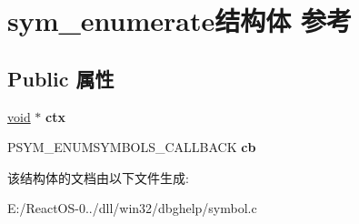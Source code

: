 \hypertarget{structsym__enumerate}{}\section{sym\+\_\+enumerate结构体 参考}
\label{structsym__enumerate}
\subsection*{Public 属性}
\begin{DoxyCompactItemize}
\item 
\mbox{\label{structsym__enumerate_ab2f0ea19dc26b39ac554c8a674cad885}} 
\hyperlink{interfacevoid}{void} $\ast$ {\bfseries ctx}
\item 
\mbox{\label{structsym__enumerate_a24064bd70b81884d55cfbcdf5c189d5d}} 
P\+S\+Y\+M\+\_\+\+E\+N\+U\+M\+S\+Y\+M\+B\+O\+L\+S\+\_\+\+C\+A\+L\+L\+B\+A\+CK {\bfseries cb}
\end{DoxyCompactItemize}


该结构体的文档由以下文件生成\+:\begin{DoxyCompactItemize}
\item 
E\+:/\+React\+O\+S-\/0../dll/win32/dbghelp/symbol.\+c\end{DoxyCompactItemize}
